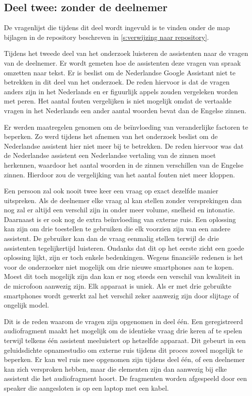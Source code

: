 \subsection{Deel twee: zonder de deelnemer}
De vragenlijst die tijdens dit deel wordt ingevuld is te vinden onder de map bijlagen in de repository beschreven in \ref{s:verwijzing naar repository}.

Tijdens het tweede deel van het onderzoek luisteren de assistenten naar de vragen van de deelnemer. Er wordt gemeten hoe de assistenten deze vragen van spraak omzetten naar tekst. 
Er is beslist om de Nederlandse Google Assistant niet te betrekken in dit deel van het onderzoek. De reden hiervoor is dat de vragen anders zijn in het Nederlands en er figuurlijk appels zouden vergeleken worden met peren. Het aantal fouten vergelijken is niet mogelijk omdat de vertaalde vragen in het Nederlands een ander aantal woorden bevat dan de Engelse zinnen.

Er werden maatregelen genomen om de beïnvloeding van veranderlijke factoren te beperken. Zo werd tijdens het afnemen van het onderzoek beslist om de Nederlandse assistent hier niet meer bij te betrekken. De reden hiervoor was dat de Nederlandse assistent een Nederlandse vertaling van de zinnen moet herkennen, waardoor het aantal woorden in de zinnen verschillen van de Engelse zinnen. Hierdoor zou de vergelijking van het aantal fouten niet meer kloppen.

Een persoon zal ook nooit twee keer een vraag op exact dezelfde manier uitspreken. Als de deelnemer elke vraag al kan stellen zonder versprekingen dan nog zal er altijd een verschil zijn in onder meer volume, snelheid en intonatie. Daarnaast is er ook nog de extra beïnvloeding van externe ruis.
Een oplossing kan zijn om drie toestellen te gebruiken die elk voorzien zijn van een andere assistent. De gebruiker kan dan de vraag eenmalig stellen terwijl de drie assistenten tegelijkertijd luisteren. Ondanks dat dit op het eerste zicht een goede oplossing lijkt, zijn er toch enkele bedenkingen. Wegens financiële redenen is het voor de onderzoeker niet mogelijk om drie nieuwe smartphones aan te kopen. Moest dit toch mogelijk zijn dan kan er nog steeds een verschil van kwaliteit in de microfoon aanwezig zijn. Elk apparaat is uniek. Als er met drie gebruikte smartphones wordt gewerkt zal het verschil zeker aanwezig zijn door slijtage of ongelijk model.

Dit is de reden waarom de vragen zijn opgenomen in deel één. Een geregistreerd audiofragment maakt het mogelijk om de identieke vraag drie keren af te spelen terwijl telkens één assistent meeluistert op hetzelfde apparaat. Dit gebeurt in een geluidsdichte opnamestudio om externe ruis tijdens dit proces zoveel mogelijk te beperken. Er kan wel ruis mee opgenomen zijn tijdens deel één, of een deelnemer kan zich versproken hebben, maar die elementen zijn dan aanwezig bij elke assistent die het audiofragment hoort. De fragmenten worden afgespeeld door een speaker die aangesloten is op een laptop met een kabel.

